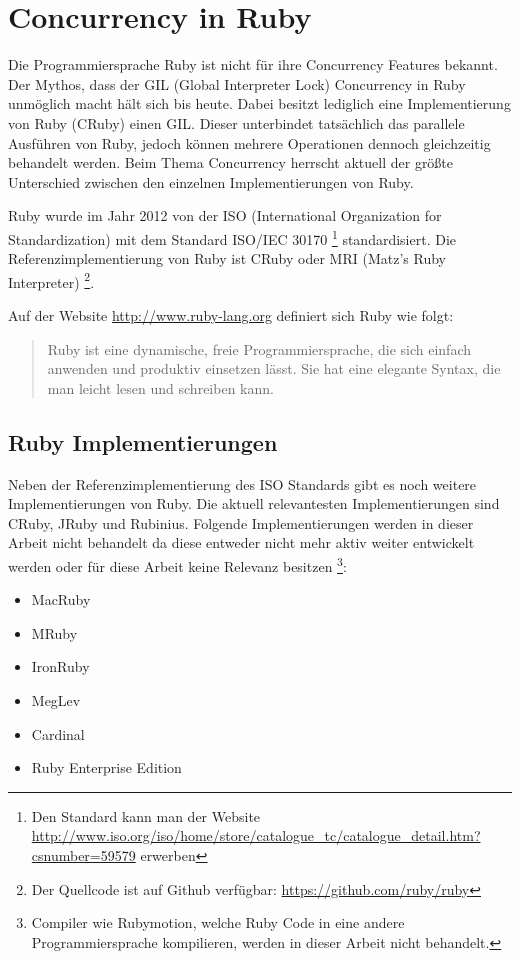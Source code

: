 \section{Concurrency in Ruby}
\label{section: Ruby}

Die Programmiersprache Ruby ist nicht für ihre Concurrency Features bekannt. Der Mythos, dass der GIL (Global Interpreter Lock) Concurrency in Ruby unmöglich macht hält sich bis heute. Dabei besitzt lediglich eine Implementierung von Ruby (CRuby) einen GIL. Dieser unterbindet tatsächlich das parallele Ausführen von Ruby, jedoch können mehrere Operationen dennoch gleichzeitig behandelt werden. Beim Thema Concurrency herrscht aktuell der größte Unterschied zwischen den einzelnen Implementierungen von Ruby.

Ruby wurde im Jahr 2012 von der ISO (International Organization for Standardization) mit dem Standard ISO/IEC 30170 \footnote{Den Standard kann man der Website \url{http://www.iso.org/iso/home/store/catalogue_tc/catalogue_detail.htm?csnumber=59579} erwerben} standardisiert. Die Referenzimplementierung von Ruby ist CRuby oder MRI (Matz's Ruby Interpreter) \footnote{Der Quellcode ist auf Github verfügbar: \url{https://github.com/ruby/ruby}}.

Auf der Website \url{http://www.ruby-lang.org} definiert sich Ruby wie folgt:

\begin{quote}
  Ruby ist eine dynamische, freie Programmiersprache, die sich einfach anwenden und produktiv einsetzen lässt. Sie hat eine elegante Syntax, die man leicht lesen und schreiben kann.
\end{quote}

\subsection{Ruby Implementierungen}

Neben der Referenzimplementierung des ISO Standards gibt es noch weitere Implementierungen von Ruby. Die aktuell relevantesten Implementierungen sind CRuby, JRuby und Rubinius. Folgende Implementierungen werden in dieser Arbeit nicht behandelt da diese entweder nicht mehr aktiv weiter entwickelt werden oder für diese Arbeit keine Relevanz besitzen 
\footnote{Compiler wie Rubymotion, welche Ruby Code in eine andere Programmiersprache kompilieren, werden in dieser Arbeit nicht behandelt.}:

\begin{itemize}
  \item MacRuby
  \item MRuby
  \item IronRuby
  \item MegLev
  \item Cardinal
  \item Ruby Enterprise Edition
\end{itemize}

